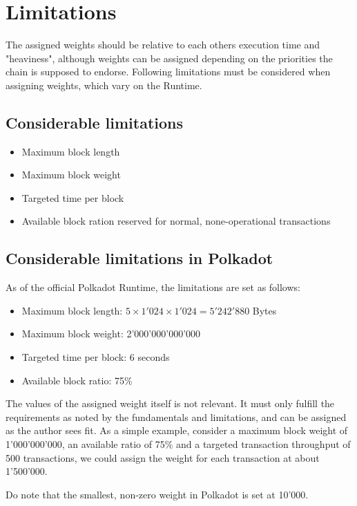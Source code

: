 \documentclass[11pt,a4paper]{article}
\begin{document}
\section{Limitations}\label{sec:limitations}
The assigned weights should be relative to each others execution time and "heaviness",
although weights can be assigned depending on the priorities the chain is supposed to endorse.
Following limitations must be considered when assigning weights, which vary on the Runtime.

\subsection{Considerable limitations}
\begin{itemize}
\item Maximum block length
\item Maximum block weight
\item Targeted time per block
\item Available block ration reserved for normal, none-operational transactions
\end{itemize}

\subsection{Considerable limitations in Polkadot}
As of the official Polkadot Runtime, the limitations are set as follows:

\begin{itemize}
\item Maximum block length: $5 \times 1'024 \times 1'024 = 5'242'880$ Bytes
\item Maximum block weight: 2'000'000'000'000
\item Targeted time per block: 6 seconds
\item Available block ratio: 75\%
\end{itemize}

The values of the assigned weight itself is not relevant. It must only fulfill the requirements
as noted by the fundamentals and limitations, and can be assigned as the author sees fit.
As a simple example, consider a maximum block weight of 1'000'000'000, an available ratio of
75\% and a targeted transaction throughput of 500 transactions, we could assign the weight
for each transaction at about 1'500'000.
\newline

Do note that the smallest, non-zero weight in Polkadot is set at 10'000.
\end{document}
